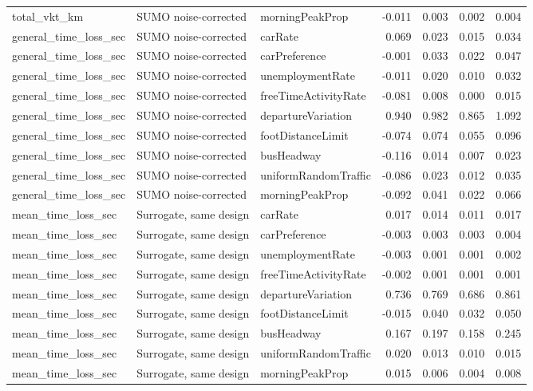 \begin{table}[!htbp]
\begin{tabular}{lllrrrr}
total\_vkt\_km & SUMO noise-corrected & morningPeakProp & -0.011 & 0.003 & 0.002 & 0.004 \\
general\_time\_loss\_sec & SUMO noise-corrected & carRate & 0.069 & 0.023 & 0.015 & 0.034 \\
general\_time\_loss\_sec & SUMO noise-corrected & carPreference & -0.001 & 0.033 & 0.022 & 0.047 \\
general\_time\_loss\_sec & SUMO noise-corrected & unemploymentRate & -0.011 & 0.020 & 0.010 & 0.032 \\
general\_time\_loss\_sec & SUMO noise-corrected & freeTimeActivityRate & -0.081 & 0.008 & 0.000 & 0.015 \\
general\_time\_loss\_sec & SUMO noise-corrected & departureVariation & 0.940 & 0.982 & 0.865 & 1.092 \\
general\_time\_loss\_sec & SUMO noise-corrected & footDistanceLimit & -0.074 & 0.074 & 0.055 & 0.096 \\
general\_time\_loss\_sec & SUMO noise-corrected & busHeadway & -0.116 & 0.014 & 0.007 & 0.023 \\
general\_time\_loss\_sec & SUMO noise-corrected & uniformRandomTraffic & -0.086 & 0.023 & 0.012 & 0.035 \\
general\_time\_loss\_sec & SUMO noise-corrected & morningPeakProp & -0.092 & 0.041 & 0.022 & 0.066 \\
mean\_time\_loss\_sec & Surrogate, same design & carRate & 0.017 & 0.014 & 0.011 & 0.017 \\
mean\_time\_loss\_sec & Surrogate, same design & carPreference & -0.003 & 0.003 & 0.003 & 0.004 \\
mean\_time\_loss\_sec & Surrogate, same design & unemploymentRate & -0.003 & 0.001 & 0.001 & 0.002 \\
mean\_time\_loss\_sec & Surrogate, same design & freeTimeActivityRate & -0.002 & 0.001 & 0.001 & 0.001 \\
mean\_time\_loss\_sec & Surrogate, same design & departureVariation & 0.736 & 0.769 & 0.686 & 0.861 \\
mean\_time\_loss\_sec & Surrogate, same design & footDistanceLimit & -0.015 & 0.040 & 0.032 & 0.050 \\
mean\_time\_loss\_sec & Surrogate, same design & busHeadway & 0.167 & 0.197 & 0.158 & 0.245 \\
mean\_time\_loss\_sec & Surrogate, same design & uniformRandomTraffic & 0.020 & 0.013 & 0.010 & 0.015 \\
mean\_time\_loss\_sec & Surrogate, same design & morningPeakProp & 0.015 & 0.006 & 0.004 & 0.008 \\

\end{tabular}
\end{table}

